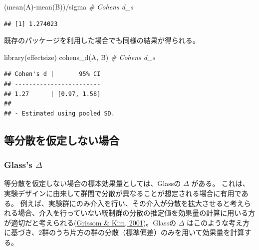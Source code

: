 \documentclass[
  ja=standard, xelatex, base=12pt]{bxjsreport}
\newenvironment{Shaded}{\begin{snugshade}}{\end{snugshade}}
\newcommand{\CommentTok}[1]{\textcolor[rgb]{0.56,0.35,0.01}{\textit{#1}}}
\newcommand{\FunctionTok}[1]{\textcolor[rgb]{0.00,0.00,0.00}{#1}}
\newcommand{\NormalTok}[1]{#1}
\newcommand{\SpecialCharTok}[1]{\textcolor[rgb]{0.00,0.00,0.00}{#1}}
\begin{document}
\begin{Shaded}
\begin{Highlighting}[]
\NormalTok{(}\FunctionTok{mean}\NormalTok{(A)}\SpecialCharTok{{-}}\FunctionTok{mean}\NormalTok{(B))}\SpecialCharTok{/}\NormalTok{sigma  }\CommentTok{\# Cohen\textquotesingle{}s d\_s}
\end{Highlighting}
\end{Shaded}

\begin{verbatim}
## [1] 1.274023
\end{verbatim}

既存のパッケージを利用した場合でも同様の結果が得られる。

\begin{Shaded}
\begin{Highlighting}[]
\FunctionTok{library}\NormalTok{(effectsize)}
\FunctionTok{cohens\_d}\NormalTok{(A, B)  }\CommentTok{\# Cohen\textquotesingle{}s d\_s}
\end{Highlighting}
\end{Shaded}

\begin{verbatim}
## Cohen's d |       95% CI
## ------------------------
## 1.27      | [0.97, 1.58]
## 
## - Estimated using pooled SD.
\end{verbatim}

\hypertarget{ux7b49ux5206ux6563ux3092ux4eeeux5b9aux3057ux306aux3044ux5834ux5408}{%
\subsection{等分散を仮定しない場合}\label{ux7b49ux5206ux6563ux3092ux4eeeux5b9aux3057ux306aux3044ux5834ux5408}}

\hypertarget{glasss-delta}{%
\subsubsection{\texorpdfstring{Glass's \(\Delta\)}{Glass's \textbackslash Delta}}\label{glasss-delta}}

等分散を仮定しない場合の標本効果量としては、Glassの \(\Delta\) がある。 これは、実験デザインに由来して群間で分散が異なることが想定される場合に有用である。 例えば、実験群にのみ介入を行い、その介入が分散を拡大させると考えられる場合、介入を行っていない統制群の分散の推定値を効果量の計算に用いる方が適切だと考えられる(\protect\hyperlink{ref-grissom2001}{Grissom \& Kim, 2001})。Glassの \(\Delta\) はこのような考え方に基づき、2群のうち片方の群の分散（標準偏差）のみを用いて効果量を計算する。
\end{document}

